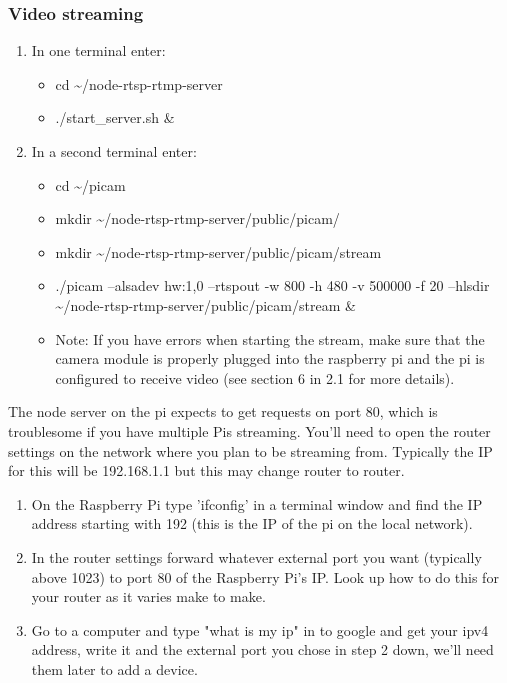 \documentclass[onecolumn, draftclsnofoot,10pt, compsoc]{IEEEtran}
\begin{document}
\subsubsection{Video streaming}
\begin{enumerate}
    \item In one terminal enter:
    \begin{itemize}
        \item cd \~{}/node-rtsp-rtmp-server 
        \item ./start\_server.sh & 
    \end{itemize}
\item In a second terminal enter: 
\begin{itemize}
    \item  cd \~{}/picam 
    \item mkdir \~{}/node-rtsp-rtmp-server/public/picam/
    \item mkdir \~{}/node-rtsp-rtmp-server/public/picam/stream
    \item ./picam --alsadev hw:1,0 --rtspout -w 800 -h 480 -v 500000 -f 20 --hlsdir \~{}/node-rtsp-rtmp-server/public/picam/stream & 
    \item Note: If you have errors when starting the stream, make sure that the camera module is properly plugged into the raspberry pi and the pi is configured to receive video (see section 6 in 2.1 for more details).
\end{itemize}
\end{enumerate}
The node server on the pi expects to get requests on port 80, which is troublesome if you have multiple Pis streaming. You'll need to open the router settings on the network where you plan to be streaming from. Typically the IP for this will be 192.168.1.1 but this may change router to router.

\begin{enumerate}
    \item On the Raspberry Pi type 'ifconfig' in a terminal window and find the IP address starting with 192 (this is the IP of the pi on the local network).
    \item  In the router settings forward whatever external port you want (typically above 1023) to port 80 of the Raspberry Pi's IP. Look up how to do this for your router as it varies make to make.
    \item  Go to a computer and type "what is my ip" in to google and get your ipv4 address, write it and the external port you chose in step 2 down, we'll need them later to add a device.
\end{enumerate}
\newpage
\end{document}

